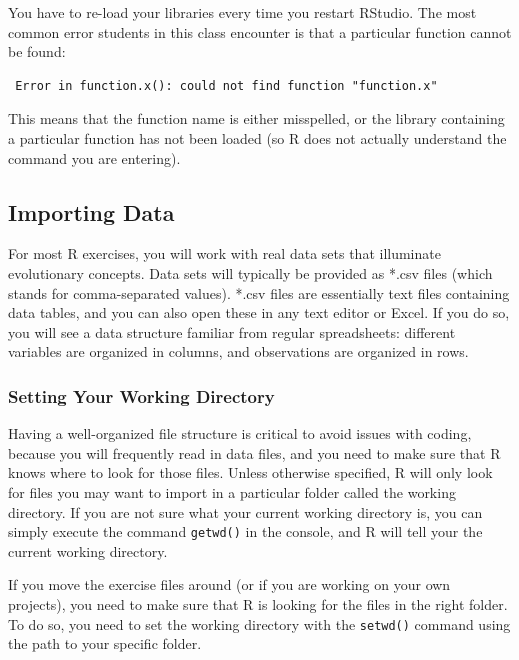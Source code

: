 \documentclass[
]{book}
\begin{document}
You have to re-load your libraries every time you restart RStudio. The most common error students in this class encounter is that a particular function cannot be found:

\begin{verbatim}
 Error in function.x(): could not find function "function.x"
\end{verbatim}

This means that the function name is either misspelled, or the library containing a particular function has not been loaded (so R does not actually understand the command you are entering).

\hypertarget{import-data}{%
\subsection{Importing Data}\label{import-data}}

For most R exercises, you will work with real data sets that illuminate evolutionary concepts. Data sets will typically be provided as *.csv files (which stands for comma-separated values). *.csv files are essentially text files containing data tables, and you can also open these in any text editor or Excel. If you do so, you will see a data structure familiar from regular spreadsheets: different variables are organized in columns, and observations are organized in rows.

\hypertarget{setting-your-working-directory}{%
\subsubsection*{Setting Your Working Directory}\label{setting-your-working-directory}}

Having a well-organized file structure is critical to avoid issues with coding, because you will frequently read in data files, and you need to make sure that R knows where to look for those files. Unless otherwise specified, R will only look for files you may want to import in a particular folder called the working directory. If you are not sure what your current working directory is, you can simply execute the command \texttt{getwd()} in the console, and R will tell your the current working directory.

If you move the exercise files around (or if you are working on your own projects), you need to make sure that R is looking for the files in the right folder. To do so, you need to set the working directory with the \texttt{setwd()} command using the path to your specific folder.
\end{document}
